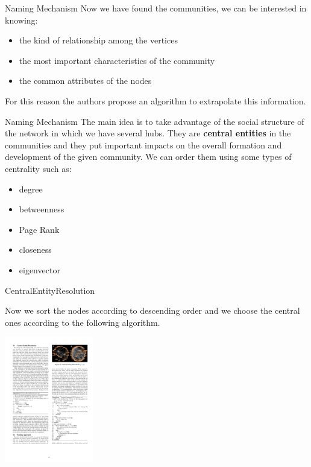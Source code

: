 \begin{frame}{Naming Mechanism}
\vskip 0.7cm
Now we have found the communities, we can be interested in knowing:
\begin{itemize}
	\item the kind of relationship among the vertices
	\item the most important characteristics of the community
	\item the common attributes of the nodes 
\end{itemize}
\vskip 0.8cm
For this reason the authors propose an algorithm to extrapolate this information.
\end{frame}

\begin{frame}{Naming Mechanism}
\vskip 0.5cm
The main idea is to take advantage of the social structure of the network in which we have several hubs.
\vskip 0.3cm
 They are \textbf{central entities} in the communities and they put important impacts on the overall formation and development of the given community.
 \vskip 0.3cm
 We can order them using some types of centrality such as:
 \begin{itemize}
 	\item degree
	\item betweenness
	\item Page Rank
	\item closeness
	\item eigenvector
 \end{itemize}

 \end{frame}
 
\begin{frame}{CentralEntityResolution}
\vskip 0.5cm

 Now we sort the nodes according to descending order and we choose the central ones according to the following algorithm.
 \begin{center}
	\includegraphics[height=5.5cm]{images/centralEntityResolution.pdf}
\end{center}
\end{frame}


